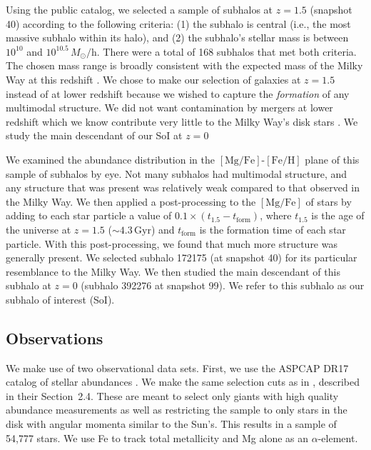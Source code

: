 \documentclass[linenumbers, twocolumn]{aastex631}
\newcommand{\Msun}{\ensuremath{M_{\odot}}}
\newcommand{\Gyr}{\ensuremath{\textrm{Gyr}}}
\newcommand{\FeH}{\ensuremath{[\textrm{Fe}/\textrm{H}]}}
\newcommand{\MgFe}{\ensuremath{[\textrm{Mg}/\textrm{Fe}]}}
\begin{document}
Using the public catalog, we selected a sample of subhalos at $z=1.5$ (snapshot 40) according to the following criteria: (1) the subhalo is central (i.e., the most massive subhalo within its halo), and (2) the subhalo's stellar mass is between $10^{10}$ and $10^{10.5}\,\Msun/\textrm{h}$. There were a total of 168 subhalos that met both criteria. The chosen mass range is broadly consistent with the expected mass of the Milky Way at this redshift \citep{2013ApJ...771L..35V}. We chose to make our selection of galaxies at $z=1.5$ instead of at lower redshift because we wished to capture the \textit{formation} of any multimodal structure. We did not want contamination by mergers at lower redshift which we know contribute very little to the Milky Way's disk stars \citep[e.g.,][]{2016ARA&A..54..529B}. We study the main descendant of our SoI at $z=0$

We examined the abundance distribution in the \MgFe{}-\FeH{} plane of this sample of subhalos by eye. Not many subhalos had multimodal structure, and any structure that was present was relatively weak compared to that observed in the Milky Way. We then applied a post-processing to the \MgFe{} of stars by adding to each star particle a value of $0.1\times\left(t_{1.5}-t_{\textrm{form}}\right)$, where $t_{1.5}$ is the age of the universe at $z=1.5$ ($\sim4.3\,\Gyr$) and $t_{\textrm{form}}$ is the formation time of each star particle. With this post-processing, we found that much more structure was generally present. We selected subhalo 172175 (at snapshot 40) for its particular resemblance to the Milky Way. We then studied the main descendant of this subhalo at $z=0$ (subhalo 392276 at snapshot 99). We refer to this subhalo as our subhalo of interest (SoI).

\subsection{Observations}\label{ssec:obs}
We make use of two observational data sets. First, we use the ASPCAP DR17 catalog of stellar abundances \citep[][J.A.~Holtzman et al., in preparation]{2016AJ....151..144G}. We make the same selection cuts as in \citet{2024arXiv240707985B}, described in their Section~2.4. These are meant to select only giants with high quality abundance measurements as well as restricting the sample to only stars in the disk with angular momenta similar to the Sun's. This results in a sample of 54,777 stars. We use Fe to track total metallicity and Mg alone as an $\alpha$-element.
\end{document}
